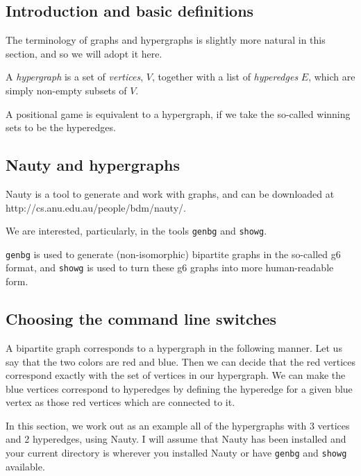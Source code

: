 \subsection{Introduction and basic definitions}


The terminology of graphs and hypergraphs is slightly more natural in this section, and so we will adopt it here.

\begin{definition}
  A \emph{hypergraph} is a set of \emph{vertices},  $V$, together with a list of \emph{hyperedges} $E$, which are simply non-empty subsets of $V$.
\end{definition}


A positional game is equivalent to a hypergraph, if we take the so-called winning sets to be the hyperedges.



\subsection{Nauty and hypergraphs}


Nauty is a tool to generate and work with graphs, and can be downloaded at http://cs.anu.edu.au/people/bdm/nauty/.

We are interested, particularly, in the tools \texttt{genbg} and \texttt{showg}.

\texttt{genbg} is used to generate (non-isomorphic) bipartite graphs in the so-called g6 format, and \texttt{showg} is used to turn these g6 graphs into more human-readable form.


\subsection{Choosing the command line switches}

A bipartite graph corresponds to a hypergraph in the following manner.
Let us say that the two colors are red and blue. Then we can decide that the red vertices correspond exactly with the set of vertices in our hypergraph.
We can make the blue vertices correspond to hyperedges by defining the hyperedge for a given blue vertex as those red vertices which are connected to it.


In this section, we work out as an example all of the hypergraphs with 3 vertices and 2 hyperedges, using Nauty.
I will assume that Nauty has been installed and your current directory is wherever you installed Nauty or have \texttt{genbg} and \texttt{showg} available.

